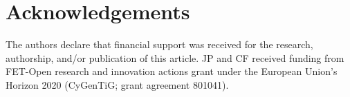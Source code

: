 \documentclass[fontsize=11pt,a4paper]{article}
\begin{document}

\section{Acknowledgements} 

The authors declare that financial support was received for the research, authorship, and/or
publication of this article.
JP and CF received funding from FET-Open research and innovation actions grant
under the European Union’s Horizon 2020 (CyGenTiG; grant agreement 801041).



\end{document}
